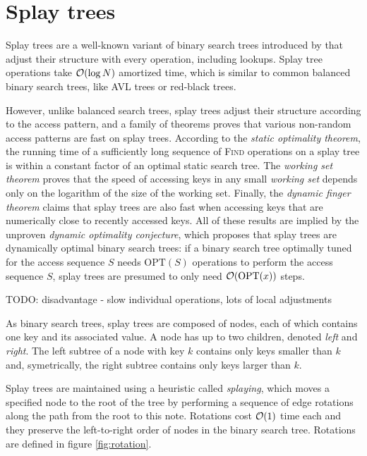 \chapter{Splay trees}
\label{chapter:splay}
Splay trees are a well-known variant of binary search trees introduced
by \cite{splay} that adjust their structure with every operation, including
lookups. Splay tree operations take $\mathcal{O}(\log N)$ amortized time, which is
similar to common balanced binary search trees, like AVL trees or
red-black trees.

However, unlike balanced search trees, splay trees adjust their structure
according to the access pattern, and a family of theorems proves that
various non-random access patterns are fast on splay trees.
According to the \textit{static optimality theorem}, the running time
of a sufficiently long sequence of \textsc{Find} operations on a splay tree
is within a constant factor of an optimal static search tree.
The \textit{working set theorem} proves that the speed of accessing keys in
any small \textit{working set} depends only on the logarithm of the size
of the working set.
Finally, the \textit{dynamic finger theorem} claims that splay trees are also
fast when accessing keys that are numerically close to recently accessed keys.
All of these results are implied by the unproven \textit{dynamic optimality
conjecture}, which proposes that splay trees are dynamically optimal binary
search trees: if a binary search tree optimally tuned for the access sequence
$S$ needs $\mathrm{OPT}(S)$ operations to perform the access sequence $S$,
splay trees are presumed to only need $\mathcal{O}(\mathrm{OPT}(x))$ steps.

TODO: disadvantage - slow individual operations, lots of local adjustments

As binary search trees, splay trees are composed of nodes, each of which
contains one key and its associated value. A node has up to two children,
denoted \textit{left} and \textit{right}.
The left subtree of a node with key $k$ contains only keys smaller than $k$ and,
symetrically, the right subtree contains only keys larger than $k$.


Splay trees are maintained using a heuristic called \textit{splaying}, which
moves a specified node to the root of the tree by performing a sequence
of edge rotations along the path from the root to this note.
Rotations cost $\mathcal{O}(1)$ time each and they preserve the left-to-right order
of nodes in the binary search tree. Rotations are defined in figure
\ref{fig:rotation}.

